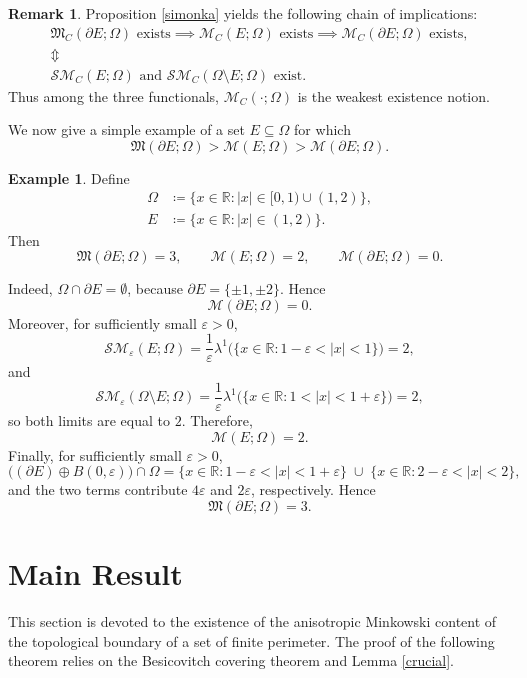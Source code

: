 \documentclass[pdflatex,sn-mathphys-num]{sn-jnl}
\theoremstyle{plain}
\theoremstyle{definition}
\newtheorem{rem}[theorem]{Remark}
\newtheorem{example}[theorem]{Example}
\begin{document}
\begin{rem}\label{implik}
Proposition \ref{simonka} yields the following chain of implications:
\begin{gather*} 
\mathfrak{M}_{C}(\partial E; \Omega)\text{ exists} \implies \mathscr{M}_{C}(E; \Omega)\text{ exists} \implies \mathcal{M}_{C}(\partial E; \Omega)\text{ exists},\\
\Updownarrow \\
\mathcal{SM}_C(E; \Omega) \text{ and } \mathcal{SM}_C(\Omega\setminus E; \Omega) \text{ exist}.
\end{gather*}
Thus among the three functionals, $\mathcal{M}_C(\cdot; \Omega)$ is the weakest existence notion.
\end{rem}

We now give a simple example of a set $E\subseteq\Omega$ for which
\[
\mathfrak{M}(\partial E; \Omega) > \mathscr{M}(E; \Omega) > \mathcal{M}(\partial E; \Omega).
\]

\begin{example}
Define
\begin{align*}
\Omega &\coloneq \{x \in \mathbb{R} : |x| \in [0, 1) \cup (1, 2)\},\\
E &\coloneq \{x \in \mathbb{R} : |x| \in (1, 2)\}.
\end{align*}
Then
\[
\mathfrak{M}(\partial E; \Omega) = 3,\qquad
\mathscr{M}(E; \Omega) = 2,\qquad
\mathcal{M}(\partial E; \Omega) = 0.
\]

Indeed, $\Omega\cap\partial E=\emptyset$, because $\partial E=\{\pm1, \pm2\}$. Hence
\[
\mathcal{M}(\partial E; \Omega)=0.
\]
Moreover, for sufficiently small $\varepsilon>0$,
\[
\mathcal{SM}_{\varepsilon}(E; \Omega)
=\frac{1}{\varepsilon}\lambda^1\big(\{x\in\mathbb{R} : 1-\varepsilon<|x|<1\}\big)=2,
\]
and
\[
\mathcal{SM}_{\varepsilon}(\Omega\setminus E; \Omega)
=\frac{1}{\varepsilon}\lambda^1\big(\{x\in\mathbb{R} : 1<|x|<1+\varepsilon\}\big)=2,
\]
so both limits are equal to $2$. Therefore,
\[
\mathscr{M}(E; \Omega)=2.
\]
Finally, for sufficiently small $\varepsilon>0$,
\[
\big((\partial E)\oplus B(0, \varepsilon)\big)\cap\Omega
=
\{x\in\mathbb{R}:1-\varepsilon<|x|<1+\varepsilon\}
\;\cup\;
\{x\in\mathbb{R}:2-\varepsilon<|x|<2\},
\]
and the two terms contribute $4\varepsilon$ and $2\varepsilon$, respectively. Hence
\[
\mathfrak{M}(\partial E; \Omega)=3.
\]
\end{example}


\medskip

\section{Main Result}
\label{secMainResult}
This section is devoted to the existence of the anisotropic Minkowski content of the topological boundary of a set of finite perimeter. The proof of the following theorem relies on the Besicovitch covering theorem and Lemma \ref{crucial}.
\end{document}
